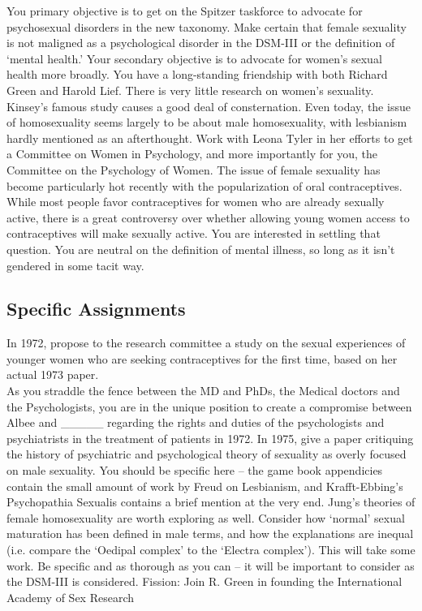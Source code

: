 You primary objective is to get on the Spitzer taskforce to advocate for psychosexual disorders in the new taxonomy. Make certain that female sexuality is not maligned as a psychological disorder in the DSM-III or the definition of `mental health.' Your secondary objective is to advocate for women's sexual health more broadly. You have a long-standing friendship with both Richard Green and Harold Lief.
There is very little research on women's sexuality. Kinsey's famous study causes a good deal of consternation. Even today, the issue of homosexuality seems largely to be about male homosexuality, with lesbianism hardly mentioned as an afterthought. Work with Leona Tyler in her efforts to get a Committee on Women in Psychology, and more importantly for you, the Committee on the Psychology of Women.
The issue of female sexuality has become particularly hot recently with the popularization of oral contraceptives. While most people favor contraceptives for women who are already sexually active, there is a great controversy over whether allowing young women access to contraceptives will make sexually active. You are interested in settling that question.
You are neutral on the definition of mental illness, so long as it isn’t gendered in some tacit way.

\subsection{Specific Assignments}
\label{specificassignments}

In 1972, propose to the research committee a study on the sexual experiences of younger women who are seeking contraceptives for the first time, based on her actual 1973 paper.\\
As you straddle the fence between the MD and PhDs, the Medical doctors and the Psychologists, you are in the unique position to create a compromise between Albee and \_\_\_\_\_ regarding the rights and duties of the psychologists and psychiatrists in the treatment of patients in 1972.
In 1975, give a paper critiquing the history of psychiatric and psychological theory of sexuality as overly focused on male sexuality. You should be specific here – the game book appendicies contain the small amount of work by Freud on Lesbianism, and Krafft-Ebbing's Psychopathia Sexualis contains a brief mention at the very end. Jung's theories of female homosexuality are worth exploring as well. Consider how `normal' sexual maturation has been defined in male terms, and how the explanations are inequal (i.e. compare the `Oedipal complex' to the `Electra complex'). This will take some work. Be specific and as thorough as you can – it will be important to consider as the DSM-III is considered.
Fission: Join R. Green in founding the International Academy of Sex Research

